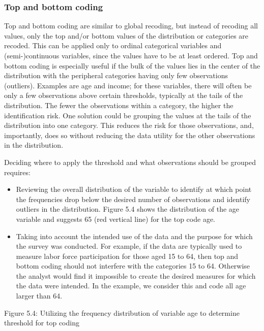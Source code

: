 \documentclass[letterpaper,10pt,english]{sphinxmanual}
\begin{document}
\subsubsection{Top and bottom coding}
\label{\detokenize{anon_methods:top-and-bottom-coding}}
Top and bottom coding are similar to global recoding, but instead of
recoding all values, only the top and/or bottom values of the
distribution or categories are recoded. This can be applied only to
ordinal categorical variables and (semi-)continuous variables, since the
values have to be at least ordered. Top and bottom coding is especially
useful if the bulk of the values lies in the center of the distribution
with the peripheral categories having only few observations (outliers).
Examples are age and income; for these variables, there will often be
only a few observations above certain thresholds, typically at the tails
of the distribution. The fewer the observations within a category, the
higher the identification risk. One solution could be grouping the
values at the tails of the distribution into one category. This reduces
the risk for those observations, and, importantly, does so without
reducing the data utility for the other observations in the
distribution.

Deciding where to apply the threshold and what observations should be
grouped requires:
\begin{itemize}
\item {} 
Reviewing the overall distribution of the variable to identify at
which point the frequencies drop below the desired number of
observations and identify outliers in the distribution. Figure 5.4
shows the distribution of the age variable and suggests 65 (red
vertical line) for the top code age.

\item {} 
Taking into account the intended use of the data and the purpose for
which the survey was conducted. For example, if the data are
typically used to measure labor force participation for those aged 15
to 64, then top and bottom coding should not interfere with the
categories 15 to 64. Otherwise the analyst would find it impossible
to create the desired measures for which the data were intended. In
the example, we consider this and code all age larger than 64.

\end{itemize}

\noindent{}

Figure 5.4: Utilizing the frequency distribution of variable age to
determine threshold for top coding
\end{document}
